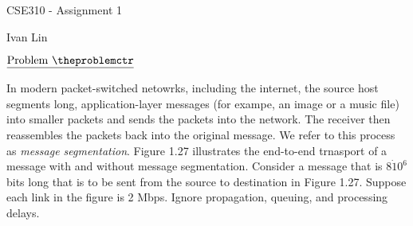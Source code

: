 \documentclass[11pt]{article}
\def\pp{\par\noindent}
\begin{document}
\centerline{CSE310 - Assignment 1}
\centerline{Ivan Lin}
\bigskip


\addtocounter{problemctr}{1}
\bigskip
\noindent
$\underline{\rm Problem\ \theproblemctr}$\pp In modern packet-switched netowrks, including the internet, the source host segments long, application-layer messages (for exampe, an image or a music file) into smaller packets and sends the packets into the network. The receiver then reassembles the packets back into the original message. We refer to this process as \textit{message segmentation}. Figure 1.27 illustrates the end-to-end trnasport of a message with and without message segmentation. Consider a message that is $8\dot 10^6$ bits long that is to be sent from the source to destination in Figure 1.27. Suppose each link in the figure is 2 Mbps. Ignore propagation, queuing, and processing delays.
\bigskip
\end{document}
